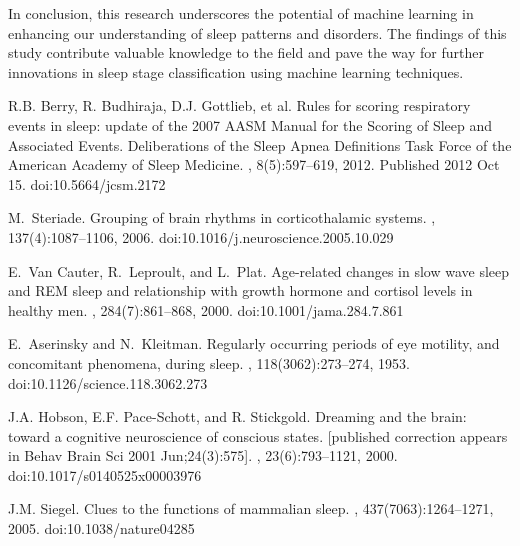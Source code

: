 \documentclass[12pt, a4paper,oneside]{book}
\numberwithin{equation}{section}
\begin{document}
In conclusion, this research underscores the potential of machine learning in enhancing our understanding of sleep patterns and disorders. The findings of this study contribute valuable knowledge to the field and pave the way for further innovations in sleep stage classification using machine learning techniques.









\begin{thebibliography}{999}


R.B. Berry, R. Budhiraja, D.J. Gottlieb, et al.
\newblock Rules for scoring respiratory events in sleep: update of the 2007 AASM Manual for the Scoring of Sleep and Associated Events. Deliberations of the Sleep Apnea Definitions Task Force of the American Academy of Sleep Medicine.
, 8(5):597--619, 2012.
\newblock Published 2012 Oct 15. doi:10.5664/jcsm.2172


M.~Steriade.
\newblock Grouping of brain rhythms in corticothalamic systems.
, 137(4):1087--1106, 2006.
\newblock doi:10.1016/j.neuroscience.2005.10.029

E.~Van Cauter, R.~Leproult, and L.~Plat.
\newblock Age-related changes in slow wave sleep and REM sleep and relationship with growth hormone and cortisol levels in healthy men.
, 284(7):861--868, 2000.
\newblock doi:10.1001/jama.284.7.861

E.~Aserinsky and N.~Kleitman.
\newblock Regularly occurring periods of eye motility, and concomitant phenomena, during sleep.
, 118(3062):273--274, 1953.
\newblock doi:10.1126/science.118.3062.273

J.A. Hobson, E.F. Pace-Schott, and R. Stickgold.
\newblock Dreaming and the brain: toward a cognitive neuroscience of conscious states. [published correction appears in Behav Brain Sci 2001 Jun;24(3):575].
, 23(6):793--1121, 2000.
\newblock doi:10.1017/s0140525x00003976

J.M. Siegel.
\newblock Clues to the functions of mammalian sleep.
, 437(7063):1264--1271, 2005.
\newblock doi:10.1038/nature04285



\end{thebibliography}
\end{document}
